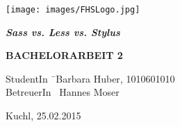 \begin{titlepage}
\begin{center}

\texttt{[image: images/FHSLogo.jpg]}

\vspace*{4cm}

\Large{
	\textit{\textbf{Sass vs. Less vs. Stylus}}
}

\vspace*{4cm}

\large{
	\textbf{BACHELORARBEIT 2}
}

\end{center}

\vfill

\begin{tabbing}
StudentIn \= \ Barbara Huber, 1010601010 \\
BetreuerIn \> \ Hannes Moser
\end{tabbing}

Kuchl, 25.02.2015

\end{titlepage}
